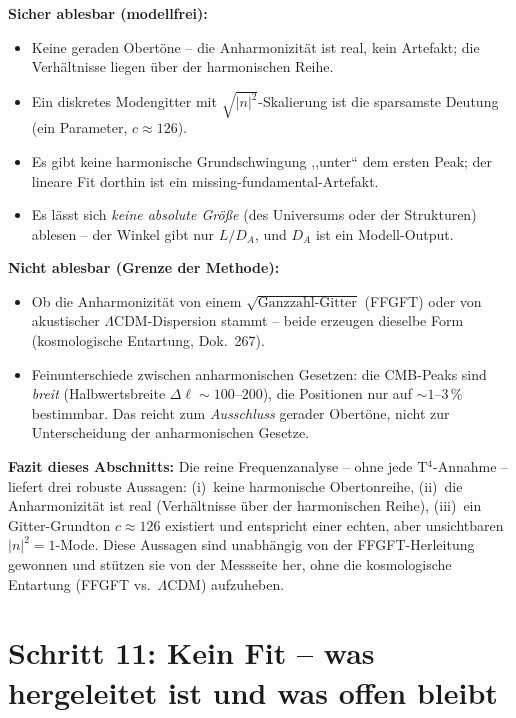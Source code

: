 \textbf{Sicher ablesbar (modellfrei):}
\begin{itemize}
  \item Keine geraden Obertöne -- die Anharmonizität ist real, kein
        Artefakt; die Verhältnisse liegen über der harmonischen Reihe.
  \item Ein diskretes Modengitter mit $\sqrt{|n|^2}$-Skalierung ist die
        sparsamste Deutung (ein Parameter, $c \approx 126$).
  \item Es gibt keine harmonische Grundschwingung ,,unter`` dem ersten
        Peak; der lineare Fit dorthin ist ein missing-fundamental-Artefakt.
  \item Es lässt sich \emph{keine absolute Größe} (des Universums oder der
        Strukturen) ablesen -- der Winkel gibt nur $L/D_A$, und $D_A$ ist
        ein Modell-Output.
\end{itemize}

\textbf{Nicht ablesbar (Grenze der Methode):}
\begin{itemize}
  \item Ob die Anharmonizität von einem $\sqrt{\text{Ganzzahl-Gitter}}$
        (FFGFT) oder von akustischer $\Lambda$CDM-Dispersion stammt --
        beide erzeugen dieselbe Form (kosmologische Entartung, Dok.~267).
  \item Feinunterschiede zwischen anharmonischen Gesetzen: die CMB-Peaks sind
        \emph{breit} (Halbwertsbreite $\Delta\ell \sim 100$--$200$), die
        Positionen nur auf $\sim 1$--$3\,\%$ bestimmbar. Das reicht zum
        \emph{Ausschluss} gerader Obertöne, nicht zur Unterscheidung der
        anharmonischen Gesetze.
\end{itemize}

\textbf{Fazit dieses Abschnitts:} Die reine Frequenzanalyse -- ohne jede
T$^4$-Annahme -- liefert drei robuste Aussagen: (i)~keine harmonische
Obertonreihe, (ii)~die Anharmonizität ist real (Verhältnisse über der
harmonischen Reihe), (iii)~ein
Gitter-Grundton $c \approx 126$ existiert und entspricht einer echten,
aber unsichtbaren $|n|^2{=}1$-Mode. Diese Aussagen sind unabhängig von
der FFGFT-Herleitung gewonnen und stützen sie von der Messseite her,
ohne die kosmologische Entartung (FFGFT vs.\ $\Lambda$CDM) aufzuheben.

\section{Schritt 11: Kein Fit -- was hergeleitet ist und was offen bleibt}


